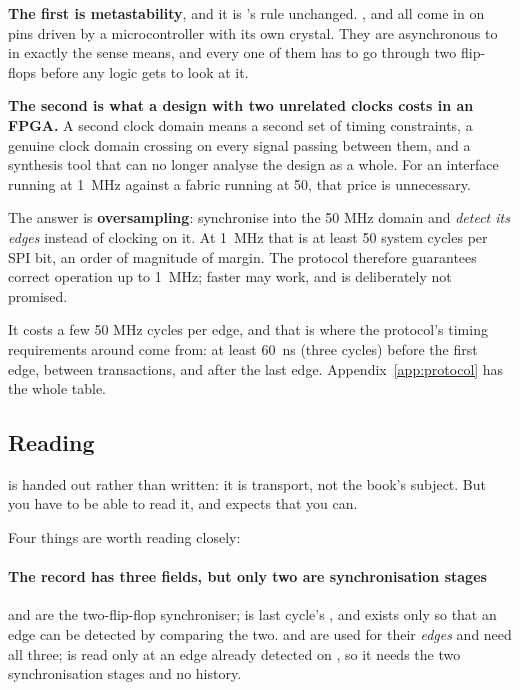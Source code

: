 \textbf{The first is metastability}, and it is 's rule unchanged. ,
 and  all come in on pins driven by a microcontroller with its own crystal. They
are asynchronous to  in exactly the sense  means, and every one of them has
to go through two flip-flops before any logic gets to look at it.

\textbf{The second is what a design with two unrelated clocks costs in an FPGA.} A second clock domain
means a second set of timing constraints, a genuine clock domain crossing on every signal passing
between them, and a synthesis tool that can no longer analyse the design as a whole. For an interface
running at 1~MHz against a fabric running at 50, that price is unnecessary.

The answer is \textbf{oversampling}: synchronise  into the 50 MHz domain and \emph{detect
its edges} instead of clocking on it. At 1~MHz that is at least 50 system cycles per SPI bit, an order
of magnitude of margin. The protocol therefore guarantees correct operation up to 1~MHz; faster may
work, and is deliberately not promised.

It costs a few 50 MHz cycles per edge, and that is where the protocol's timing requirements around
 come from: at least 60~ns (three cycles) before the first  edge, between
transactions, and after the last edge. Appendix~\ref{app:protocol} has the whole table.

\subsection{Reading }
\label{c18:sub:slave}

 is handed out rather than written: it is transport, not the book's subject. But you
have to be able to read it, and  expects that you can.


Four things are worth reading closely:

\paragraph{The record  has three fields, but only two are synchronisation stages}
 and  are the two-flip-flop synchroniser;  is last cycle's , and
exists only so that an edge can be detected by comparing the two.  and  are used
for their \emph{edges} and need all three;  is read only at an edge already detected on
, so it needs the two synchronisation stages and no history.

